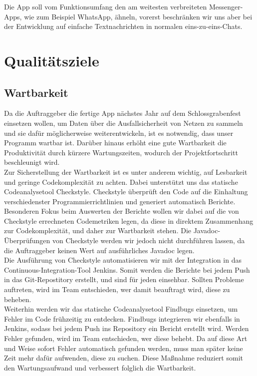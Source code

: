 \documentclass[accentcolor=tud0b,12pt,paper=a4]{tudreport}
\begin{document}
    Die App soll vom Funktionsumfang den am weitesten verbreiteten Messenger-Apps, wie zum Beispiel WhatsApp, ähneln, vorerst beschränken wir uns aber bei der Entwicklung auf einfache Textnachrichten in normalen eins-zu-eins-Chats.\\

  \chapter{Qualitätsziele}
        \section{Wartbarkeit}

    Da die Auftraggeber die fertige App nächstes Jahr auf dem Schlossgrabenfest einsetzen wollen, um Daten über die Ausfallsicherheit von Netzen zu sammeln und sie dafür möglicherweise weiterentwickeln, ist es notwendig, dass unser Programm wartbar ist. Darüber hinaus erhöht eine gute Wartbarkeit die Produktivität durch kürzere Wartungszeiten, wodurch der Projektfortschritt beschleunigt wird.\\

                Zur Sicherstellung der Wartbarkeit ist es unter anderem wichtig, auf Lesbarkeit und geringe Codekomplexität zu achten. Dabei unterstützt uns das statische Codeanalysetool Checkstyle. Checkstyle überprüft den Code auf die Einhaltung verschiedenster Programmierrichtlinien und generiert automatisch Berichte. Besonderen Fokus beim Auswerten der Berichte wollen wir dabei auf die von Checkstyle errechneten Codemetriken legen, da diese in direktem Zusammenhang zur Codekomplexität, und daher zur Wartbarkeit stehen. Die Javadoc-Überprüfungen von Checkstyle werden wir jedoch nicht durchführen lassen, da die Auftraggeber keinen Wert auf ausführliches Javadoc legen.\\

                Die Ausführung von Checkstyle automatisieren wir mit der Integration in das Continuous-Integration-Tool Jenkins. Somit werden die Berichte bei jedem Push in das Git-Repostitory erstellt, und sind für jeden einsehbar. Sollten Probleme auftreten, wird im Team entschieden, wer damit beauftragt wird, diese zu beheben.\\

                Weiterhin werden wir das statische Codeanalysetool Findbugs einsetzen, um Fehler im Code frühzeitig zu entdecken. Findbugs integrieren wir ebenfalls in Jenkins, sodass bei jedem Push ins Repository ein Bericht erstellt wird. Werden Fehler gefunden, wird im Team entschieden, wer diese behebt. Da auf diese Art und Weise sofort Fehler automatisch gefunden werden, muss man später keine Zeit mehr dafür aufwenden, diese zu suchen. Diese Maßnahme reduziert somit den Wartungsaufwand und verbessert folglich die Wartbarkeit.\\
\end{document}
